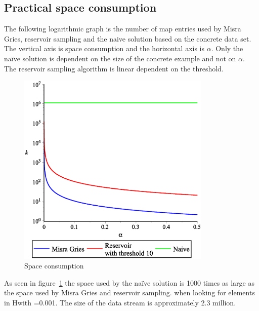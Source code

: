 \subsection{Practical space consumption}
The following logarithmic graph is the number of map entries used by Misra Gries, reservoir sampling and the naive solution based on the concrete data set. The vertical axis is space consumption and the horizontal axis is \(\alpha\). Only the naïve solution is dependent on the size of the concrete example and not on \(\alpha\). The reservoir sampling algorithm is linear dependent on the threshold.
\begin{figure}[H]
	\centering
	\includegraphics[width=350px]{img/streamingMemoryGraph.eps}
	\caption{Space consumption}
	\label{fig:space_consumption}
\end{figure}
As seen in figure~\ref{fig:space_consumption} the space used by the naïve solution is 1000 times as large as the space used by Misra Gries and reservoir sampling. when looking for elements in Hwith =0.001. The size of the data stream is approximately 2.3 million.
\\ \\ \\ \\
